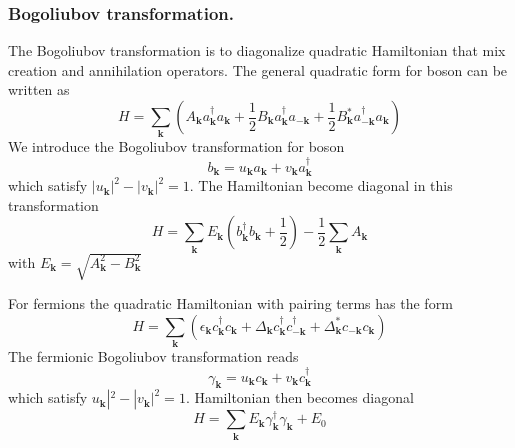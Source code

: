 \documentclass[../../../main.tex]{subfiles}
\begin{document}
\subsubsection{Bogoliubov transformation.}
The Bogoliubov transformation is to diagonalize quadratic Hamiltonian that mix creation and annihilation operators.
The general quadratic form for boson can be written as
\begin{equation*}
  H = \sum_\mathbf{k} \left( A_\mathbf{k} a_\mathbf{k}^{\dagger} a_\mathbf{k} + \frac{1}{2} B_\mathbf{k} a_\mathbf{k}^{\dagger} a_{-\mathbf{k}} + \frac{1}{2} B_\mathbf{k}^* a_{-\mathbf{k}}^{\dagger} a_\mathbf{k} \right) 
\end{equation*}
We introduce the Bogoliubov transformation for boson
\begin{equation*}
b_\mathbf{k} = u_\mathbf{k}a_\mathbf{k} + v_\mathbf{k}a^{\dagger}_\mathbf{k}
\end{equation*}
which satisfy $|u_\mathbf{k}|^2 - |v_\mathbf{k}|^2 = 1$.
The Hamiltonian become diagonal in this transformation
\begin{equation*}
  H = \sum_\mathbf{k} E_\mathbf{k} \left( b_\mathbf{k}^\dagger b_\mathbf{k} + \frac{1}{2} \right) - \frac{1}{2} \sum_\mathbf{k} A_\mathbf{k}
\end{equation*}
with $E_\mathbf{k}=\sqrt{A_\mathbf{k}^2-B_\mathbf{k}^2}$

For fermions the quadratic Hamiltonian with pairing terms has the form
\begin{equation*}
  H = \sum_\mathbf{k} \left( \epsilon_\mathbf{k} c_\mathbf{k}^\dagger c_\mathbf{k} + \Delta_\mathbf{k} c_\mathbf{k}^\dagger c_{-\mathbf{k}}^\dagger + \Delta_\mathbf{k}^* c_{-\mathbf{k}} c_\mathbf{k} \right) 
\end{equation*}
The fermionic Bogoliubov transformation reads
\begin{equation*}
  \gamma_\mathbf{k} = u_\mathbf{k} c_\mathbf{k} + v_\mathbf{k} c_\mathbf{k}^\dagger
\end{equation*}
which satisfy $u_\mathbf{k}|^2 - |v_\mathbf{k}|^2 = 1$.
Hamiltonian then becomes diagonal
\begin{equation*}
  H = \sum_\mathbf{k} E_\mathbf{k} \gamma_\mathbf{k}^\dagger \gamma_\mathbf{k} + E_0
\end{equation*}
\end{document}
